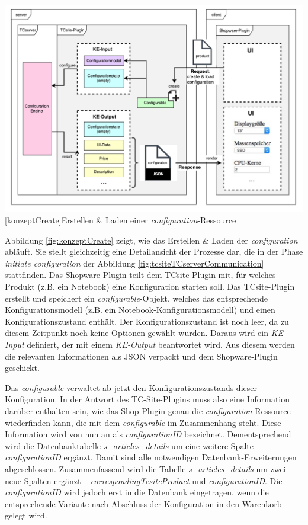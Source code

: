 \documentclass[12pt,a4paper,bibliography=totocnumbered,listof=totoc]{scrartcl}
\begin{document}
\vspace{1em}
\begin{minipage}{\linewidth}
	\centering
	\includegraphics[width=1\linewidth]{Abbildungen/konzeptCreate.pdf}
	[konzeptCreate]{Erstellen \& Laden einer \emph{configuration}-Ressource}
	\label{fig:konzeptCreate}
\end{minipage}
\vspace{1em}

Abbildung \ref{fig:konzeptCreate} zeigt, wie das Erstellen \& Laden der \emph{configuration} abläuft. Sie stellt gleichzeitig eine Detailansicht der Prozesse dar, die in der Phase \emph{initiate configuration} der Abbildung  \ref{fig:tcsiteTCserverCommunication} stattfinden. Das Shopware-Plugin teilt dem TCsite-Plugin mit, für welches Produkt (z.B. ein Notebook) eine Konfiguration starten soll. Das TCsite-Plugin erstellt und speichert ein \emph{configurable}-Objekt, welches das entsprechende Konfigurationsmodell (z.B. ein Notebook-Konfigurationsmodell) und einen Konfigurationszustand enthält. Der Konfigurationszustand ist noch leer, da zu diesem Zeitpunkt noch keine Optionen gewählt wurden. Daraus wird ein \emph{KE-Input} definiert, der mit einem \emph{KE-Output} beantwortet wird. Aus diesem werden die relevanten Informationen als JSON verpackt und dem Shopware-Plugin geschickt.

Das \emph{configurable} verwaltet ab jetzt den Konfigurationszustands dieser Konfiguration. In der Antwort des TC-Site-Plugins muss also eine Information darüber enthalten sein, wie das Shop-Plugin genau die \emph{configuration}-Ressource wiederfinden kann, die mit dem \emph{configurable} im Zusammenhang steht. Diese Information wird von nun an als \emph{configurationID} bezeichnet. Dementsprechend wird die Datenbanktabelle \emph{s\_articles\_details} um eine weitere Spalte \emph{configurationID} ergänzt. Damit sind alle notwendigen Datenbank-Erweiterungen abgeschlossen. Zusammenfassend wird die Tabelle \emph{s\_articles\_details} um zwei neue Spalten ergänzt -- \emph{correspondingTcsiteProduct} und \emph{configurationID}. Die \emph{configurationID} wird jedoch erst in die Datenbank eingetragen, wenn die entsprechende Variante nach Abschluss der Konfiguration in den Warenkorb gelegt wird.
\end{document}
